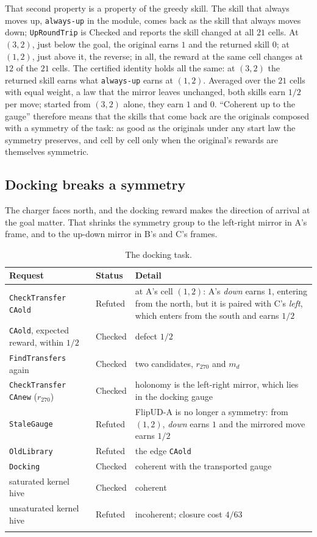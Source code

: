 \documentclass[11pt]{article}
\newcommand{\code}[1]{\texttt{#1}}
\theoremstyle{definition}
\theoremstyle{plain}
\begin{document}
That second property is a property of the greedy skill. The skill that always moves up,
\code{always-up} in the module, comes back as the skill that always moves down; \code{UpRoundTrip} is
Checked and reports the skill changed at all $21$ cells. At $(3,2)$, just below the goal, the
original earns $1$ and the returned skill $0$; at $(1,2)$, just above it, the reverse; in all, the
reward at the same cell changes at $12$ of the $21$ cells. The certified identity holds all the
same: at $(3,2)$ the returned skill earns what \code{always-up} earns at $(1,2)$. Averaged over the
$21$ cells with equal weight, a law that the mirror leaves unchanged, both skills earn $1/2$ per move;
started from $(3,2)$ alone, they earn $1$ and $0$. ``Coherent up to the gauge'' therefore means that
the skills that come back are the originals composed with a symmetry of the task: as good as the
originals under any start law the symmetry preserves, and cell by cell only when the original's
rewards are themselves symmetric.

\subsection{Docking breaks a symmetry}

The charger faces north, and the docking reward makes the direction of arrival at the goal matter.
That shrinks the symmetry group to the left-right mirror in A's frame, and to the up-down mirror in
B's and C's frames.

\begin{longtable}{>{\raggedright\arraybackslash}p{4.2cm}l>{\raggedright\arraybackslash}p{7.6cm}}
\toprule
Request & Status & Detail\\
\midrule
\endhead
\code{CheckTransfer CAold} & Refuted & at A's cell $(1,2)$: A's \emph{down} earns $1$, entering from the north, but it is paired with C's \emph{left}, which enters from the south and earns $1/2$\\
\code{CAold}, expected reward, within $1/2$ & Checked & defect $1/2$\\
\code{FindTransfers} again & Checked & two candidates, $r_{270}$ and $m_d$\\
\code{CheckTransfer CAnew} ($r_{270}$) & Checked & holonomy is the left-right mirror, which lies in the docking gauge\\
\code{StaleGauge} & Refuted & FlipUD-A is no longer a symmetry: from $(1,2)$, \emph{down} earns $1$ and the mirrored move earns $1/2$\\
\code{OldLibrary} & Refuted & the edge \code{CAold}\\
\code{Docking} & Checked & coherent with the transported gauge\\
saturated kernel hive & Checked & coherent\\
unsaturated kernel hive & Refuted & incoherent; closure cost $4/63$\\
\bottomrule
\caption{The docking task.}\label{tab:ex3dock}
\end{longtable}
\end{document}
